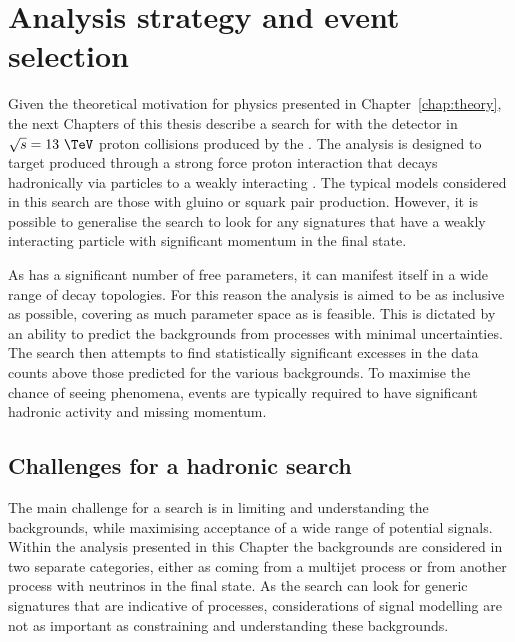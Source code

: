 \chapter{Analysis strategy and event selection} %
\label{chap:selection}

Given the theoretical motivation for \BSM physics presented in
Chapter~\ref{chap:theory}, the next Chapters of this thesis describe a
search for \SUSY with the \CMS detector in $\sqrt{s}=13~\tev$ proton collisions
produced by the \LHC. The analysis is designed to target \SUSY
produced through a strong force proton interaction that decays hadronically via
\SM particles to a weakly interacting \LSP. The typical \SUSY models
considered in this search are those with gluino or squark pair
production. However, it is possible to generalise the search to look
for any \BSM signatures that have a weakly interacting particle with
significant momentum in the final state.

As \SUSY has a significant number of free parameters, it can manifest
itself in a wide range of decay topologies. For this reason the
analysis is aimed to be as inclusive as possible, covering as much
parameter space as is feasible.  This is dictated by an ability to
predict the backgrounds from \SM processes with minimal uncertainties.
The search then attempts to find statistically significant excesses in
the data counts above those predicted for the various backgrounds. To
maximise the chance of seeing \BSM phenomena, events are typically
required to have significant hadronic activity and missing momentum.  


\section{Challenges for a hadronic \BSM search}
\label{sec:challenge}

The main challenge for a \BSM search is in limiting and
understanding the backgrounds, while maximising acceptance of a wide
range of potential \BSM signals. Within the analysis presented in this
Chapter the backgrounds are considered in two separate categories,
either as coming from a \QCD multijet process or from another \SM process
with neutrinos in the final state. As the search can look for generic
signatures that are indicative of \BSM processes, considerations of
signal modelling are not as important as constraining
and understanding these backgrounds.

